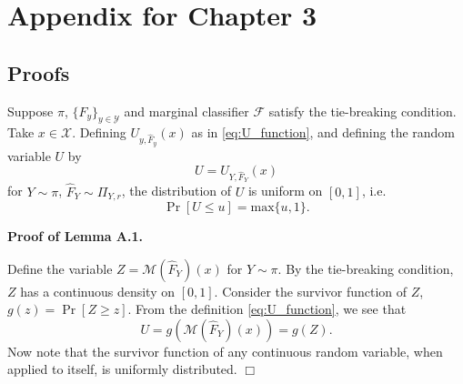 
\chapter{Appendix for Chapter 3} %

\label{AppendixC} %

\section{Proofs}

\begin{lemma}\label{lemma:U_function}
Suppose $\pi$, $\{F_y\}_{y \in \mathcal{Y}}$ and marginal classifier
$\mathcal{F}$ satisfy the tie-breaking condition.  Take $x \in \mathcal{X}$.  Defining
$U_{y,\hat{F}_y}(x)$ as in \eqref{eq:U_function}, and defining the
random variable $U$ by
\[U = U_{Y, \hat{F}_Y}(x)\]
for $Y \sim \pi$, $\hat{F}_Y \sim \Pi_{Y, r}$,
the distribution of $U$ is uniform on $[0,1]$, i.e.
\[
\Pr[U \leq u] = \text{max}\{u, 1\}.
\]
\end{lemma}

\textbf{Proof of Lemma A.1.}

Define the variable $Z = \mathcal{M}(\hat{F}_Y)(x)$ for $Y \sim \pi$.
By the tie-breaking condition, $Z$ has a continuous density on $[0,1]$.
Consider the survivor function of $Z$, $g(z) = \Pr[Z \geq z]$.  From
the definition \eqref{eq:U_function}, we see that 
\[
U = g(\mathcal{M}(\hat{F}_Y)(x)) = g(Z).
\]
Now note that the survivor function of any continuous random variable,
when applied to itself, is uniformly distributed.
$\Box$
